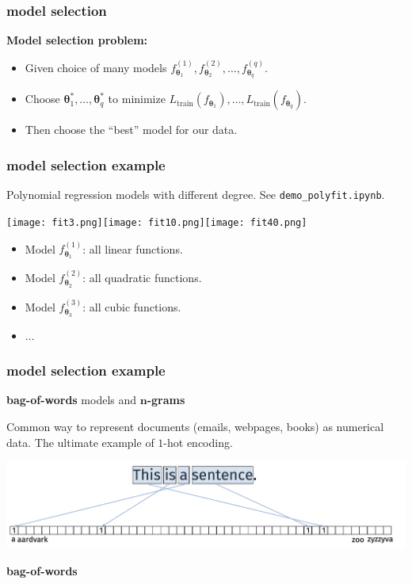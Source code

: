 \documentclass[handout,compress]{beamer}
\newcommand{\bs}[1]{\boldsymbol{#1}}
\newcommand{\bv}[1]{\mathbf{#1}}
\begin{document}
\begin{frame}
	\frametitle{model selection}
	\textbf{Model selection problem:}
	\begin{itemize}
		\item Given choice of many models $f_{\bs{\theta}_1}^{(1)}, f_{\bs{\theta}_2}^{(2)}, \ldots, f_{\bs{\theta}_q}^{(q)}.$
		\item Choose $\bs{\theta}_1^*, \ldots, \bs{\theta}_q^*$ to minimize $L_{\text{train}}(f_{\bs{\theta}_1}),\ldots, L_{\text{train}}(f_{\bs{\theta}_q})$. 
		\item Then choose the ``best'' model for our data. 
	\end{itemize}
\end{frame}

\begin{frame}
	\frametitle{model selection example}
	Polynomial regression models with different degree. 
	See \texttt{demo\_polyfit.ipynb}.
	\begin{center}
		\texttt{[image: fit3.png]}\texttt{[image: fit10.png]}\texttt{[image: fit40.png]}
	\end{center}
\begin{itemize}
	\item Model $f_{\bs{\theta}_1}^{(1)}$: all linear functions. 
	\item Model $f_{\bs{\theta}_2}^{(2)}$: all quadratic functions. 
	\item Model $f_{\bs{\theta}_3}^{(3)}$: all cubic functions. 
	\item $\ldots$
\end{itemize}
\end{frame}


\begin{frame}
	\frametitle{model selection example}
	\begin{center}
		\textbf{bag-of-words} models and \textbf{$\bv{n}$-grams}
	\end{center}
	Common way to represent documents (emails, webpages, books) as numerical data. The ultimate example of $1$-hot encoding.
	\begin{center}
		\includegraphics[width=\textwidth]{bagofwords.png}
		
		\alert{\Large \textbf{bag-of-words}}
	\end{center}
\end{frame}
\end{document}
